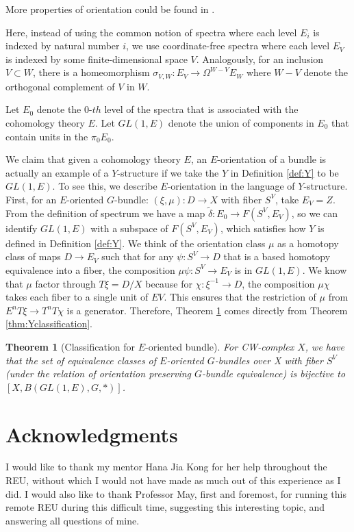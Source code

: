 \documentclass[psamsfonts]{amsart}
\newtheorem{thm}{Theorem}[section]
\theoremstyle{definition}
\theoremstyle{remark}
\numberwithin{equation}{section}
\begin{document}
More properties of orientation could be found in \cite[III, Remark 1.5]{Orientation}.

Here, instead of using the common notion of spectra where each level $E_{i}$ is indexed by natural number $i$, we use coordinate-free spectra where each level $E_{V}$ is indexed by some finite-dimensional space $V$. Analogously, for an inclusion $V \subset W$, there is a homeomorphism $\sigma_{V, W}: E_{V} \to \Omega^{W - V}E_{W}$ where $W - V$ denote the orthogonal complement of $V$ in $W$.

	Let $E_{0}$ denote the 0-$th$ level of the spectra that is associated with the cohomology theory $E$.
	Let $GL(1, E)$ denote the union of components in $E_{0}$ that contain units in the $\pi_{0}E_{0}$.
	
	We claim that given a cohomology theory $E$, an $E$-orientation of a bundle is actually an example of a $Y$-structure if we take the $Y$ in Definition \ref{def:Y} to be $GL(1, E)$. To see this, we describe $E$-orientation in the language of $Y$-structure. First, for an $E$-oriented $G$-bundle: $(\xi, \mu): D \to X$ with fiber $S^{V}$, take $E_{V} = Z$. From the definition of spectrum we have a map $\tilde{\delta}: E_{0} \to F(S^{V}, E_{V})$, so we can identify $GL(1, E)$ with a subspace of $F(S^{V}, E_{V})$, which satisfies how $Y$ is defined in Definition \ref{def:Y}. We think of the orientation class $\mu$ as a homotopy class of maps $D \to E_{V}$ such that for any $\psi: S^{V} \to D$ that is a based homotopy equivalence into a fiber, the composition $\mu\psi: S^{V} \to E_{V}$ is in $GL(1, E)$. 
We know that $\mu$ factor through $T\xi = D/X$ because for $\chi: \xi^{-1} \to D$, the composition $\mu\chi$ takes each fiber to a single unit of $EV$.
This ensures that the restriction of $\mu$ from $E^{n}T\xi \to T^{n}T\chi$ is a generator. Therefore, Theorem \ref{thm:ori} comes directly from Theorem \ref{thm:Yclassification}.

\begin{thm} [Classification for $E$-oriented bundle]
\label{thm:ori}
For CW-complex $X$, we have that the set of equivalence classes of $E$-oriented $G$-bundles over X with fiber $S^{V}$ (under the relation of orientation preserving $G$-bundle equivalence) is bijective to $[X, B(GL(1, E), G, *)]$.
\end{thm}




\section*{Acknowledgments} 
I would like to thank my mentor Hana Jia Kong for her help throughout the REU, without which I would not have made as much out of this experience as I did. I would also like to thank Professor May, first and foremost, for running this remote REU during this difficult time, suggesting this interesting topic, and answering all questions of mine.


 
 
 
\end{document}
